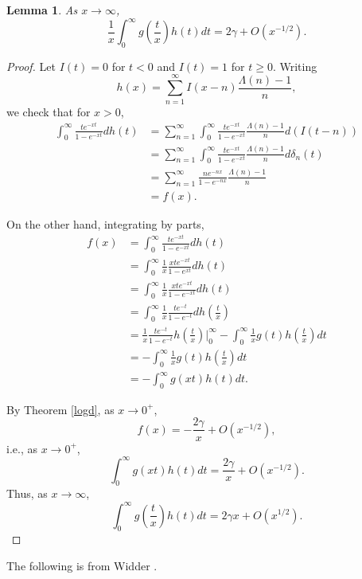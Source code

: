 \documentclass{article}
\newtheorem{lemma}[theorem]{Lemma}
\begin{document}
\begin{lemma}
As $x \to \infty$,
\[
\frac{1}{x} \int_0^\infty g\left(\frac{t}{x} \right) h(t) dt = 2\gamma + O(x^{-1/2}).
\]
\end{lemma}
\begin{proof}
Let $I(t)=0$ for $t < 0$ and $I(t)=1$ for $t \geq 0$. Writing
\[
h(x) = \sum_{n=1}^\infty I(x-n)  \frac{\Lambda(n)-1}{n},
\]
we check that for $x>0$,
\begin{align*}
\int_0^\infty \frac{te^{-xt}}{1-e^{-xt}} dh(t)&=\sum_{n=1}^\infty \int_0^\infty 
\frac{te^{-xt}}{1-e^{-xt}}  \frac{\Lambda(n)-1}{n} d(I(t-n))\\
&=\sum_{n=1}^\infty \int_0^\infty 
\frac{te^{-xt}}{1-e^{-xt}}  \frac{\Lambda(n)-1}{n} d\delta_n(t)\\
&=\sum_{n=1}^\infty \frac{ne^{-nx}}{1-e^{-nx}} \frac{\Lambda(n)-1}{n}\\
&=f(x).
\end{align*}

On the other hand, integrating by parts,
\begin{align*}
f(x)&=\int_0^\infty \frac{te^{-xt}}{1-e^{-xt}} dh(t)\\
&=\int_0^\infty \frac{1}{x} \frac{xt e^{-xt}}{1-e^{xt}} dh(t)\\
&=\int_0^\infty \frac{1}{x} \frac{xt e^{-xt}}{1-e^{-xt}} dh(t)\\
&=\int_0^\infty \frac{1}{x} \frac{t e^{-t}}{1-e^{-t}} dh\left(\frac{t}{x}\right)\\
&=\frac{1}{x} \frac{t e^{-t}}{1-e^{-t}} h\left(\frac{t}{x}\right) \bigg|_0^\infty 
- \int_0^\infty \frac{1}{x} g(t) h\left(\frac{t}{x}\right) dt\\
&=-\int_0^\infty \frac{1}{x} g(t) h\left(\frac{t}{x}\right) dt\\
&=-\int_0^\infty g(xt) h(t) dt.
\end{align*}

By Theorem \ref{logd}, as $x \to 0^+$,
\[
f(x) = -\frac{2\gamma}{x} + O(x^{-1/2}),
\]
i.e., as $x \to 0^+$,
\[
\int_0^\infty g(xt) h(t) dt = \frac{2\gamma}{x} + O(x^{-1/2}).
\]
Thus, as $x \to \infty$,
\[
\int_0^\infty g\left(\frac{t}{x} \right) h(t) dt = 2\gamma x + O(x^{1/2}).
\]
\end{proof}

The following is from Widder \cite[p.~232]{widder}.
\end{document}
